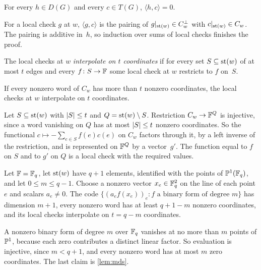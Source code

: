 \begin{lemma}\label{lem:valid}
For every $h\in D(G)$ and every $c\in T(G)$, $\langle h,c\rangle=0$.
\end{lemma}
\begin{outline}
For a local check $g$ at $w$, $\langle g,c\rangle$ is the pairing of $g|_{\operatorname{st}(w)}\in C_w^\perp$ with
$c|_{\operatorname{st}(w)}\in C_w$. The pairing is additive in~$h$, so induction over sums of local checks finishes the proof.
\end{outline}

The local checks at $w$ \emph{interpolate on $t$ coordinates} if for every set $S\subseteq\operatorname{st}(w)$ of at most $t$ edges
and every $f\colon S\to\mathbb{F}$ some local check at $w$ restricts to $f$ on~$S$.

\begin{lemma}\label{lem:mds}
If every nonzero word of $C_w$ has more than $t$ nonzero coordinates, the local checks at $w$ interpolate on $t$
coordinates.
\end{lemma}
\begin{outline}
Let $S\subseteq\operatorname{st}(w)$ with $\lvert S \rvert\le t$ and $Q=\operatorname{st}(w)\setminus S$. Restriction $C_w\to\mathbb{F}^Q$ is injective, since a word
vanishing on $Q$ has at most $\lvert S \rvert\le t$ nonzero coordinates. So the functional $c\mapsto-\sum_{e\in S}f(e)c(e)$ on
$C_w$ factors through it, by a left inverse of the restriction, and is represented on $\mathbb{F}^Q$ by a vector~$g'$. The
function equal to $f$ on $S$ and to $g'$ on $Q$ is a local check with the required values.
\end{outline}

\begin{lemma}\label{lem:grs}
\notformalized
Let $\mathbb{F}=\mathbb{F}_q$, let $\operatorname{st}(w)$ have $q+1$ elements, identified with the points of $\mathbb{P}^1(\mathbb{F}_q)$, and let $0\le m\le q-1$.
Choose a nonzero vector $x_e\in\mathbb{F}_q^2$ on the line of each point $e$ and scalars $a_e\ne0$. The code
$\{(a_ef(x_e))_e : f\text{ a binary form of degree }m\}$ has dimension $m+1$, every nonzero word has at least $q+1-m$
nonzero coordinates, and its local checks interpolate on $t=q-m$ coordinates.
\end{lemma}
\begin{informalproof}
A nonzero binary form of degree $m$ over $\mathbb{F}_q$ vanishes at no more than $m$ points of $\mathbb{P}^1$, because each zero
contributes a distinct linear factor. So evaluation is injective, since $m<q+1$, and every nonzero word has at most $m$
zero coordinates. The last claim is \cref{lem:mds}.
\end{informalproof}

